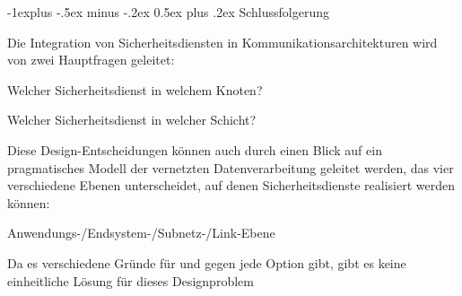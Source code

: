\documentclass[a4paper]{article}
\makeatletter
\renewcommand{\subsection}{\@startsection{subsection}{2}{0mm}%
 {-1explus -.5ex minus -.2ex}%
 {0.5ex plus .2ex}%
 {\normalfont\normalsize\bfseries}}
\makeatother
\begin{document}
\begin{multicols}{3}


      \subsection{Schlussfolgerung}
      \begin{itemize*}
            \item Die Integration von Sicherheitsdiensten in Kommunikationsarchitekturen wird von zwei Hauptfragen geleitet:
            \begin{itemize*}
                  \item Welcher Sicherheitsdienst in welchem Knoten?
                  \item Welcher Sicherheitsdienst in welcher Schicht?
            \end{itemize*}
            \item Diese Design-Entscheidungen können auch durch einen Blick auf ein pragmatisches Modell der vernetzten Datenverarbeitung geleitet werden, das vier verschiedene Ebenen unterscheidet, auf denen Sicherheitsdienste realisiert werden können:
            \begin{itemize*}
                  \item Anwendungs-/Endsystem-/Subnetz-/Link-Ebene
            \end{itemize*}
            \item Da es verschiedene Gründe für und gegen jede Option gibt, gibt es keine einheitliche Lösung für dieses Designproblem
      \end{itemize*}
      \columnbreak


\end{multicols}
\end{document}
